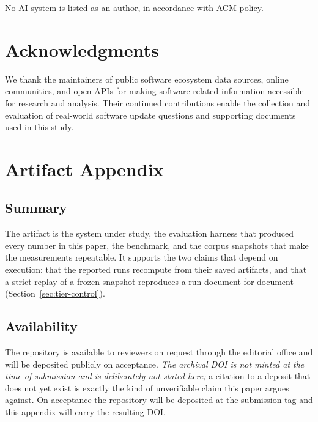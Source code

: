 \documentclass[acmsmall,review,anonymous,screen]{acmart}
\begin{document}
No AI system is listed as an author, in accordance with ACM policy.

\section*{Acknowledgments}

We thank the maintainers of public software ecosystem data sources,
online communities, and open APIs for making software-related
information accessible for research and analysis. Their continued
contributions enable the collection and evaluation of real-world
software update questions and supporting documents used in this study.




\appendix

\section{Artifact Appendix}\label{sec:artifact}


\subsection{Summary}

The artifact is the system under study, the evaluation harness that produced
every number in this paper, the benchmark, and the corpus snapshots that make
the measurements repeatable. It supports the two claims that depend on
execution: that the reported runs recompute from their saved artifacts, and that
a strict replay of a frozen snapshot reproduces a run document for document
(Section~\ref{sec:tier-control}).

\subsection{Availability}

The repository is available to reviewers on request through the editorial office
and will be deposited publicly on acceptance. \emph{The archival DOI is not
minted at the time of submission and is deliberately not stated here;} a
citation to a deposit that does not yet exist is exactly the kind of unverifiable
claim this paper argues against. On acceptance the repository will be deposited
at the submission tag and this appendix will carry the resulting DOI.
\end{document}
